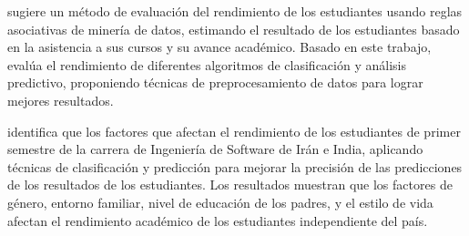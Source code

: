 



\textcite{borkar2013predicting} sugiere un método de evaluación del rendimiento de los estudiantes usando reglas asociativas de minería de datos, estimando el resultado de los estudiantes basado en la asistencia a sus cursos y su avance académico. Basado en este trabajo, \textcite{shazmeen2013performance} evalúa el rendimiento de diferentes algoritmos de clasificación y análisis predictivo, proponiendo técnicas de preprocesamiento de datos para lograr mejores resultados.


\textcite{oskouei2014predicting} identifica que los factores que afectan el rendimiento de los estudiantes de primer semestre de la carrera de Ingeniería de Software de Irán e India, aplicando técnicas de clasificación y predicción para mejorar la precisión de las predicciones de los resultados de los estudiantes. Los resultados muestran que los factores de género, entorno familiar, nivel de educación de los padres, y el estilo de vida afectan el rendimiento académico de los estudiantes independiente del país.

